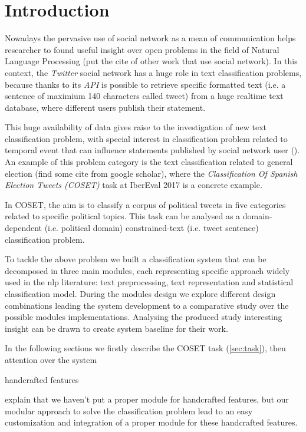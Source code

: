 \section{Introduction} \label{sec:introduction}

Nowadays the pervasive use of social network as a mean of communication helps researcher to found useful insight over open problems in the field of Natural Language Processing (put the cite of other work that use social network). In this context, the \emph{Twitter} social network has a huge role in text classification problems, because thanks to its \emph{API} is possible to retrieve specific formatted text (i.e. a sentence of maximium 140 characters called tweet) from a huge realtime text database, where different users publish their statement.

This huge availability of data gives raise to the investigation of new text classification problem, with special interest in classification problem related to temporal event that can influence statements published by social network user (). An example of this problem category is the text classification related to general election (find some cite from google scholar), where the  \emph{Classification Of Spanish Election Tweets (COSET)} task at IberEval 2017 is a concrete example. 

In COSET, the aim is to classify a corpus of political tweets in five categories related to specific political topics. This task can be analysed as a domain-dependent (i.e. political domain) constrained-text (i.e. tweet sentence) classification problem.

To tackle the above problem we built a classification system that can be decomposed in three main modules, each representing specific approach widely used in the nlp literature: text preprocessing, text representation and statistical classification model.
During the modules design we explore different design combinations leading the system development to a comparative study over the possible modules implementations.
Analysing the produced study interesting insight can be drawn to create system baseline for their work.

In the following sections we firstly describe the COSET task (\cref{sec:task}), then attention over the system


handcrafted features

explain that we haven't put a proper module for handcrafted features, but our modular approach to solve the classification problem lead to an easy customization and integration of a proper module for these handcrafted features.


